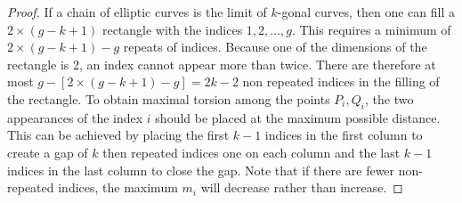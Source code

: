 \documentclass[10pt,a4paper]{amsart}
\begin{document}
\begin{proof} If a chain of elliptic curves is the limit of $k$-gonal curves, then one can fill a $2\times (g-k+1)$ rectangle with the indices $1,2,\dots, g$.
	This requires a minimum of $2\times (g-k+1)-g$ repeats of indices. 
	Because one of the dimensions of the rectangle is 2, an index cannot appear more than twice.
	There are therefore at most $g-[2\times (g-k+1)-g]=2k-2$ non repeated indices in the filling of the rectangle.
	To obtain maximal torsion among the points $P_i, Q_i$, the two appearances of the index $i$ should be placed at the maximum possible distance.
	This can be achieved by placing the first $k-1$ indices in the first column to create a gap of $k$ then repeated indices one on each column and the last $k-1$ indices in the last column to close the gap.
	Note that if there are fewer non-repeated indices, the maximum $m_i$ will decrease rather than increase.
\end{proof}
\end{document}
